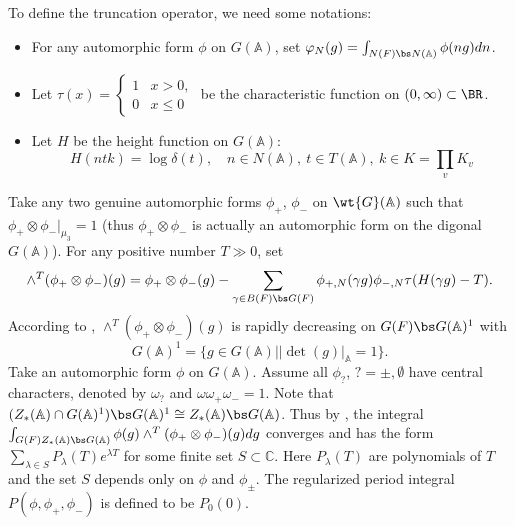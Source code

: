 \documentclass[11pt,reqno]{amsart}
\newcommand{\BA}{{\mathbb {A}}} \newcommand{\BB}{{\mathbb {B}}}
\newcommand{\BC}{{\mathbb {C}}} \newcommand{\BD}{{\mathbb {D}}}
\theoremstyle{plain}
\theoremstyle{remark} \newtheorem{remark}[thm]{Remark}
\theoremstyle{definition} \newtheorem{exercise}[thm]{Exercise}
\theoremstyle{definition} \newtheorem{example}[thm]{Example} \newtheorem{condition}[thm]{Condition}
\numberwithin{equation}{section}
\renewcommand{\-}{\text{--}}
\begin{document}
To define the truncation operator, we need some notations: 
\begin{itemize}
    \item For any automorphic form $\phi$ on $G(\BA)$, set $\varphi_N(g)=\int_{N(F)\bs N(\BA)}\phi(ng)dn$.
    \item Let $\tau(x) = \begin{cases} 1 & x > 0,\\
0 & x\leq0\end{cases}$  be the characteristic function on $(0,\infty)\subset\BR$.
    \item Let $H$ be the height function on $G(\BA)$:
    \[H(ntk)=\log \delta(t),\quad n\in N(\BA),\ t\in T(\BA),\ k\in K=\prod_vK_v\] 
    \end{itemize} 
Take any two genuine automorphic forms $\phi_+$, $\phi_-$ on $\wt{G}(\BA)$ such that $\phi_+\otimes\phi_-|_{\mu_3}=1$ (thus  $\phi_+\otimes\phi_-$ is actually an automorphic form on the digonal $G(\BA)$).
For any positive number $T\gg0$, set
\[\wedge^T (\phi_+\otimes\phi_-)(g) = \phi_+\otimes\phi_-(g) - \sum_{\gamma \in B(F) \bs G(F)} \phi_{+,N}(\gamma g)\phi_{-,N}\tau(H(\gamma g) - T).\]
According to \cite[Lemma 3.1]{Yam18}, $\wedge^T (\phi_+\otimes\phi_-)(g)$ is rapidly decreasing on $G(F)\bs G(\BA)^1$ with \[G(\BA)^1=\{g\in G(\BA)||\det(g)|_\BA=1\}.\] 
Take an automorphic form $\phi$ on $G(\BA)$. Assume all $\phi_?$, $?=\pm,\emptyset$ have central characters, denoted by $\omega_?$ and $\omega\omega_+\omega_-=1$. Note that $(Z_*(\BA)\cap G(\BA)^1)\bs G(\BA)^1\cong Z_*(\BA)\bs G(\BA)$. Thus by \cite[Proposition 3.2]{Yam18},  the integral  $\int_{G(F)Z_*(\BA)\bs G(\BA)}\phi(g)\wedge^T(\phi_+\otimes\phi_-)(g)dg$ converges and has the form $\sum_{\lambda\in S}P_\lambda(T)e^{\lambda T}$ for some finite set $S\subset \BC$. Here $P_\lambda(T)$ are polynomials of $T$ and the set $S$ depends only on $\phi$ and $\phi_\pm$. The regularized period integral  
$P(\phi,\phi_+,\phi_-)$ is defined to be $P_0(0)$.
\end{document}
